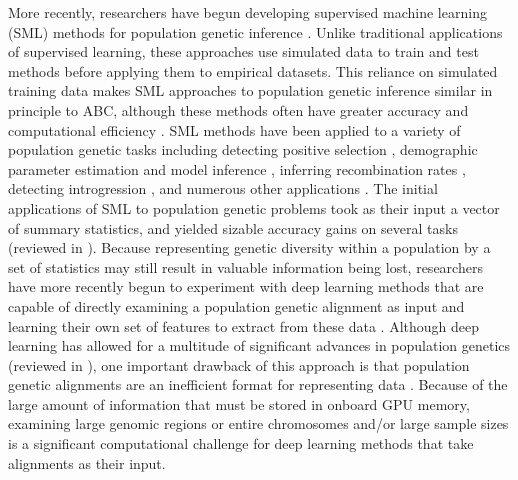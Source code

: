 More recently, researchers have begun developing supervised machine learning (SML) methods for population genetic inference \cite{korfmannDeepLearningPopulation2023a,schriderSupervisedMachineLearning2018}. Unlike traditional applications of supervised learning, these approaches use simulated data to train and test methods before applying them to empirical datasets. This reliance on simulated training data makes SML approaches to population genetic inference similar in principle to ABC, although these methods often have greater accuracy and computational efficiency \cite{pudloReliableABCModel2016,raynalABCRandomForests2019}. SML methods have been applied to a variety of population genetic tasks including detecting positive selection \cite{arnabUncoveringFootprintsNatural2022,hejaseDeepLearningApproachInference2022,kernDiploSHICUpdated2018,linDistinguishingPositiveSelection2011,mughalLocalizingClassifyingAdaptive2019,mughalLearningPropertiesAdaptive2020,pavlidisSearchingFootprintsPositive2010,pybusHierarchicalBoostingMachinelearning2015,ronenLearningNaturalSelection2013,whitehouseTimesweeperAccuratelyIdentifying2022}, demographic parameter estimation \cite{sheehanDeepLearningPopulation2016,wangAutomaticInferenceDemographic2021} and model inference \cite{sanchezDeepLearningPopulation2021}, inferring recombination rates \cite{adrionPredictingLandscapeRecombination2020,gaoNewSoftwareFast2016}, detecting introgression \cite{gowerDetectingAdaptiveIntrogression2021,rayIntroUNETIdentifyingIntrogressed2023,schriderSupervisedMachineLearning2018a}, and numerous other applications \cite{batteyPredictingGeographicLocation2020,batteyVisualizingPopulationStructure2021,bookerThisPopulationDoes2023,smithDispersalInferencePopulation2023,yelmenCreatingArtificialHuman2021}. The initial applications of SML to population genetic problems took as their input a vector of summary statistics, and yielded sizable accuracy gains on several tasks (reviewed in \cite{schriderSupervisedMachineLearning2018}). Because representing genetic diversity within a population by a set of statistics may still result in valuable information being lost, researchers have more recently begun to experiment with deep learning methods that are capable of directly examining a population genetic alignment as input and learning their own set of features to extract from these data \cite{chanLikelihoodFreeInferenceFramework2018,flagelUnreasonableEffectivenessConvolutional2019}. Although deep learning has allowed for a multitude of significant advances in population genetics (reviewed in \cite{korfmannDeepLearningPopulation2023a}), one important drawback of this approach is that population genetic alignments are an inefficient format for representing data \cite{kelleherInferringWholegenomeHistories2019}. Because of the large amount of information that must be stored in onboard GPU memory, examining large genomic regions or entire chromosomes and/or large sample sizes is a significant computational challenge for deep learning methods that take alignments as their input.

